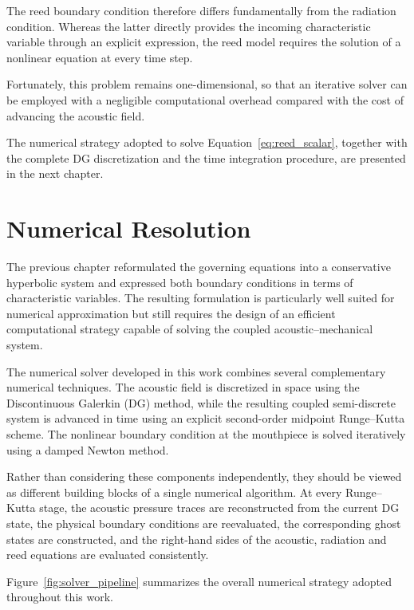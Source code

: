 \documentclass[11pt,a4paper]{report}
\theoremstyle{plain}
\theoremstyle{definition}
\begin{document}
The reed boundary condition therefore differs fundamentally from the radiation
condition. Whereas the latter directly provides the incoming characteristic
variable through an explicit expression, the reed model requires the solution of
a nonlinear equation at every time step.

Fortunately, this problem remains one-dimensional, so that an iterative solver
can be employed with a negligible computational overhead compared with the cost
of advancing the acoustic field.

The numerical strategy adopted to solve Equation~\eqref{eq:reed_scalar}, together
with the complete DG discretization and the time integration procedure, are
presented in the next chapter.

\chapter{Numerical Resolution}
\label{chap:numerical_resolution}

\minitoc

The previous chapter reformulated the governing equations into a conservative
hyperbolic system and expressed both boundary conditions in terms of
characteristic variables. The resulting formulation is particularly well suited
for numerical approximation but still requires the design of an efficient
computational strategy capable of solving the coupled acoustic--mechanical
system.

The numerical solver developed in this work combines several complementary
numerical techniques. The acoustic field is discretized in space using the
Discontinuous Galerkin (DG) method, while the resulting coupled semi-discrete
system is advanced in time using an explicit second-order midpoint
Runge--Kutta scheme. The nonlinear boundary condition at the mouthpiece is
solved iteratively using a damped Newton method.

Rather than considering these components independently, they should be viewed
as different building blocks of a single numerical algorithm. At every Runge--Kutta stage, the acoustic pressure traces are reconstructed
from the current DG state, the physical boundary conditions are reevaluated,
the corresponding ghost states are constructed, and the right-hand sides of
the acoustic, radiation and reed equations are evaluated consistently.

Figure~\ref{fig:solver_pipeline} summarizes the overall numerical strategy
adopted throughout this work.
\end{document}
